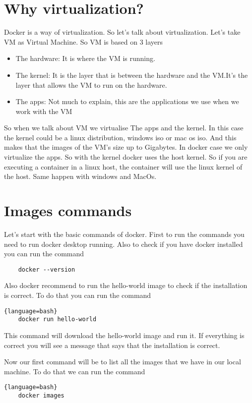 \documentclass{article}
\begin{document}
\section*{Why virtualization?}
Docker is a way of virtualization. So let's talk about virtualization. Let's take VM as Virtual Machine. 
So VM is based on 3 layers 
\begin{itemize}
    \item The hardware: It is where the VM is running.
    \item The kernel: It is the layer that is between the hardware and the VM.It's the layer that allows the VM to run on the hardware.
    \item The apps: Not much to explain, this are the applications we use when we work with the VM\\
\end{itemize}
So when we talk about VM we virtualise The apps and the kernel. In this case the kernel could be a linux distribution, windows iso or mac os iso. 
And this makes that the images of the VM's size up to Gigabytes. In docker case we only virtualize the apps. So with the kernel docker uses
the host kernel. So if you are executing a container in a linux host, the container will use the linux kernel of the host. 
Same happen with windows and MacOs. 


\section*{Images commands}
Let's start with the basic commands of docker. First to run the commands you need to run docker desktop running. Also to check if 
you have docker installed you can run the command
\begin{lstlisting}
    docker --version
\end{lstlisting}

Also docker recommend to run the hello-world image to check if the installation is correct. To do that you can run the command
\begin{lstlisting}{language=bash}
    docker run hello-world
\end{lstlisting}
 
This command will download the hello-world image and run it. If everything is correct you will see a message that says that the installation 
is correct.

Now our first command will be to list all the images that we have in our local machine. To do that we can run the command
\begin{lstlisting}{language=bash}
    docker images
\end{lstlisting}
\end{document}
